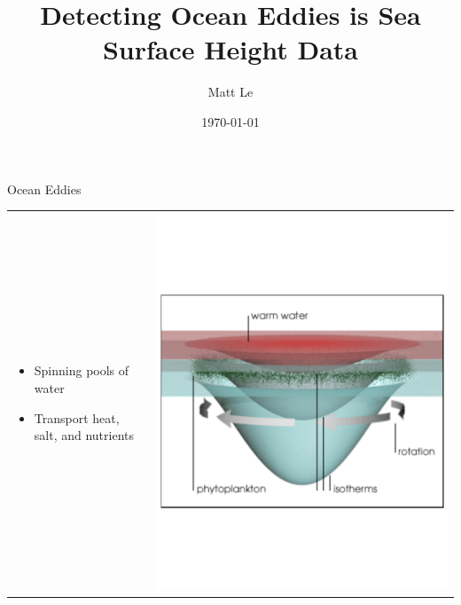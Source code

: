 \documentclass[mathserif]{beamer}
\begin{document}
\title[Cyberinfrastructure]{Detecting Ocean Eddies is Sea Surface Height Data}

\author[Matt Le]{Matt Le}

\date{\today} %

\begin{frame}
\titlepage
\end{frame}

\begin{frame}{Ocean Eddies}
\begin{tabular}[c]{p{}p{}}
 \begin{itemize}
 \item Spinning pools of water
\item Transport heat, salt, and nutrients

 \end{itemize}
 &
 \vspace{2pt}%
 \includegraphics[scale=.2]{figures/eddy_render.pdf}
 \end{tabular}
\end{frame}
\end{document}
